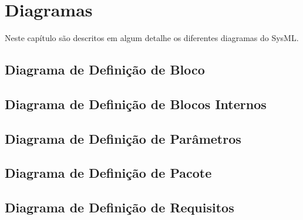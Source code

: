 \chapter{Diagramas}
\label{CAP2}

Neste capítulo são descritos em algum detalhe os diferentes diagramas do SysML. 


\section{Diagrama de Definição de Bloco}


\section{Diagrama de Definição de Blocos Internos}


\section{Diagrama de Definição de Parâmetros}


\section{Diagrama de Definição de Pacote}


\section{Diagrama de Definição de Requisitos}
